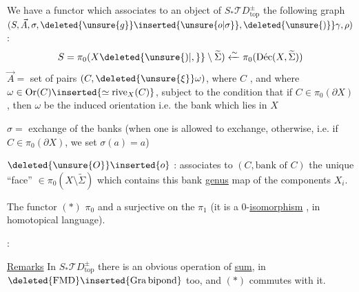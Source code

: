 We have a functor
which associates to an object  of
$S_*\mathcal TD^\pm_{\mathrm{top}}$ the following  graph
$(S,\vec A,\sigma,\deleted{\unsure{g}}\inserted{\unsure{o|\sigma}},\deleted{\unsure{)}}\gamma,\rho)$:
\[
S=\pi_0(X\deleted{\unsure{)|,}}\setminus\widetilde\Sigma)\xleftarrow{\sim}\pi_0(\text{Déc}(X,\widetilde\Sigma))
\]
$\vec A=$ set of pairs $(C,\deleted{\unsure{\xi}}\omega)$, where
$C$ , and where
$\omega\in\mathrm{Or}(C)\inserted{\simeq\mathrm{rive}_X(C)}$,
subject to the condition that if $C\in\pi_0(\partial X)$, then $\omega$
be the induced orientation i.e. the bank which lies in $X$

$\sigma=$ exchange of the banks (when one is allowed to exchange,
otherwise, i.e. if $C\in\pi_0(\partial X)$, we set $\sigma(a)=a$)

$\deleted{\unsure{O}}\inserted{o}$ : associates to $(C,\text{bank of }C)$
the unique ``face'' $\in\pi_0(X\setminus\widetilde\Sigma)$ which
 contains this bank
\uline{genus} map of the components $X_i$.

The functor $(*)$ 
 $\pi_0$ and a surjective
on the $\pi_1$ (it is a 0-\uline{isomorphism} ,
in homotopical language).

 :

\uline{Remarks} In $S_*\mathcal TD^\pm_{\mathrm{top}}$ there is an
obvious operation of  \uline{sum},
in $\deleted{\mathrm{FMD}}\inserted{\mathrm{Gra\,bipond}}$ too,
and $(*)$ commutes with it.
